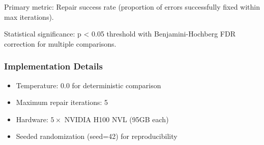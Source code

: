Primary metric: Repair success rate (proportion of errors successfully fixed within max iterations).

Statistical significance: p < 0.05 threshold with Benjamini-Hochberg FDR correction for multiple comparisons.

\subsubsection{Implementation Details}

\begin{itemize}
\item Temperature: 0.0 for deterministic comparison
\item Maximum repair iterations: 5
\item Hardware: $5\times$ NVIDIA H100 NVL (95GB each)
\item Seeded randomization (seed=42) for reproducibility
\end{itemize}
